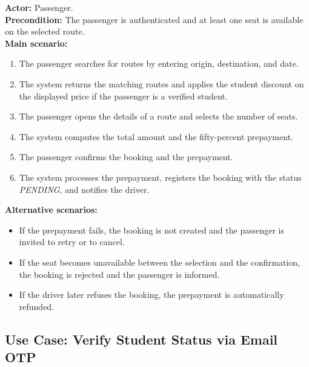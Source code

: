\textbf{Actor:} Passenger.\\
\textbf{Precondition:} The passenger is authenticated and at least one seat is available on the selected route.\\
\textbf{Main scenario:}
\begin{enumerate}[noitemsep]
    \item The passenger searches for routes by entering origin, destination, and date.
    \item The system returns the matching routes and applies the student discount on the displayed price if the passenger is a verified student.
    \item The passenger opens the details of a route and selects the number of seats.
    \item The system computes the total amount and the fifty-percent prepayment.
    \item The passenger confirms the booking and the prepayment.
    \item The system processes the prepayment, registers the booking with the status \textit{PENDING}, and notifies the driver.
\end{enumerate}
\textbf{Alternative scenarios:}
\begin{itemize}[noitemsep]
    \item If the prepayment fails, the booking is not created and the passenger is invited to retry or to cancel.
    \item If the seat becomes unavailable between the selection and the confirmation, the booking is rejected and the passenger is informed.
    \item If the driver later refuses the booking, the prepayment is automatically refunded.
\end{itemize}

\subsection{Use Case: Verify Student Status via Email OTP}

